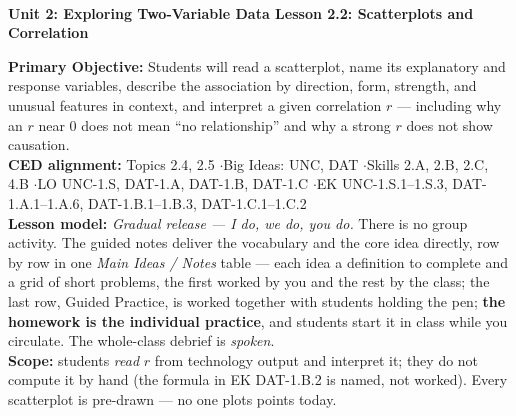 \documentclass[10pt]{article}
\newcommand{\UnitNumberName}{Unit 2: Exploring Two-Variable Data \quad}
\newcommand{\LessonNumberName}{Lesson 2.2: Scatterplots and Correlation}
\begin{document}
\begin{center}
    {\Large\bfseries \CourseName \\
    {\small\bfseries \UnitNumberName \LessonNumberName}}
\end{center}

\begin{tcolorbox}[colback=sky, colframe=navy, boxrule=0.9pt, arc=2mm,
    left=2mm, right=2mm, top=1.5mm, bottom=1.5mm]
    \textbf{Primary Objective:} Students will read a scatterplot, name its explanatory and
    response variables, describe the association by direction, form, strength, and unusual
    features in context, and interpret a given correlation $r$ --- including why an $r$ near 0
    does not mean ``no relationship'' and why a strong $r$ does not show causation.
    \\[2pt]
    \textbf{CED alignment:} Topics 2.4, 2.5 \quad$\cdot$\quad Big Ideas: UNC, DAT
    \quad$\cdot$\quad Skills 2.A, 2.B, 2.C, 4.B \quad$\cdot$\quad LO UNC-1.S, DAT-1.A,
    DAT-1.B, DAT-1.C \quad$\cdot$\quad EK UNC-1.S.1--1.S.3, DAT-1.A.1--1.A.6, DAT-1.B.1--1.B.3,
    DAT-1.C.1--1.C.2
    \\[2pt]
    \textbf{Lesson model:} \emph{Gradual release --- I do, we do, you do.} There is no group
    activity. The guided notes deliver the vocabulary and the core idea directly, row by row
    in one \emph{Main Ideas / Notes} table --- each idea a definition to complete and a grid of
    short problems, the first worked by you and the rest by the class; the last row, Guided
    Practice, is worked together with students holding the pen;
    \textbf{the homework is the individual practice}, and students start it in class while you
    circulate. The whole-class debrief is \emph{spoken}.
    \\[2pt]
    \textbf{Scope:} students \emph{read} $r$ from technology output and interpret it; they do
    not compute it by hand (the formula in EK DAT-1.B.2 is named, not worked). Every scatterplot
    is pre-drawn --- no one plots points today.
\end{tcolorbox}
\end{document}
